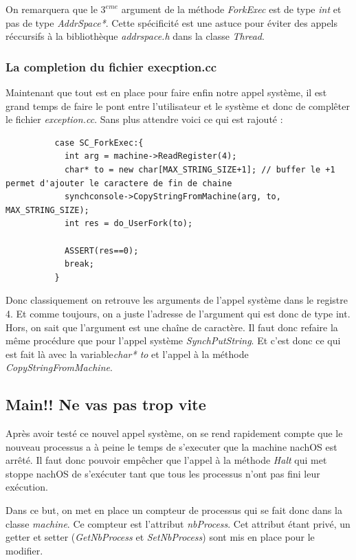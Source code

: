 \documentclass[a4paper,10pt]{report}
\begin{document}
  On remarquera que le $3^{eme}$ argument de la méthode \emph{ForkExec} est de type \emph{int} et pas de type \emph{AddrSpace*}. Cette spécificité est une 
  astuce pour éviter des appels réccursifs à la bibliothèque \emph{addrspace.h} dans la classe \emph{Thread}.
  
  \textcolor{TealBlue}{\subsubsection*{La completion du fichier execption.cc}}
  Maintenant que tout est en place pour faire enfin notre appel système, il est grand temps de faire le pont entre l'utilisateur et le système et donc
  de complêter le fichier \emph{exception.cc}. Sans plus attendre voici ce qui est rajouté : 
  \begin{lstlisting}
          case SC_ForkExec:{
            int arg = machine->ReadRegister(4);
            char* to = new char[MAX_STRING_SIZE+1]; // buffer le +1 permet d'ajouter le caractere de fin de chaine
            synchconsole->CopyStringFromMachine(arg, to, MAX_STRING_SIZE);
            int res = do_UserFork(to);

            ASSERT(res==0);
            break;
          }   
  \end{lstlisting}
  Donc classiquement on retrouve les arguments de l'appel système dans le registre 4. Et comme toujours, on a juste l'adresse de l'argument qui est donc
  de type int. Hors, on sait que l'argument est une chaîne de caractère. Il faut donc refaire la même procédure que pour l'appel 
  système \emph{SynchPutString}. Et c'est donc ce qui est fait là avec la variable\emph{char* to} et l'appel à la méthode \emph{CopyStringFromMachine}.
  
  \newpage
  \textcolor{NavyBlue}{\subsection{Main!! Ne vas pas trop vite}}
  Après avoir testé ce nouvel appel système, on se rend rapidement compte que le nouveau processus a à peine le temps de s'executer que la machine nachOS
  est arrêté. Il faut donc pouvoir empêcher que l'appel à la méthode \emph{Halt} qui met stoppe nachOS de s'exécuter tant que tous les processus n'ont pas
  fini leur exécution.
  
  Dans ce but, on met en place un compteur de processus qui se fait donc dans la classe \emph{machine}. Ce compteur est l'attribut \emph{nbProcess}. Cet
  attribut étant privé, un getter et setter (\emph{GetNbProcess} et \emph{SetNbProcess}) sont mis en place pour le modifier.
  
\end{document}
